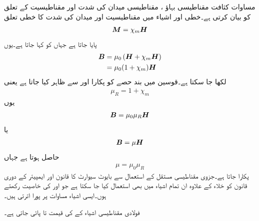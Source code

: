 مساوات  کثافت مقناطیسی  بہاؤ ، مقناطیسی میدان کی شدت  اور مقناطیسیت  کے تعلق کو بیان کرتی ہے۔خطی اور   اشیاء  میں مقناطیسیت اور میدان کی شدت کا خطی تعلق
\begin{align}\label{مساوات_امالہ_خطی_ہم_سمتی_اشیاء_تعلق}
{\ensuremath{{\boldsymbol{M}}}}=\chi_m {{\boldsymbol{H}}}
\end{align}
پایا جاتا ہے  جہاں  کو  کہا جاتا ہے۔یوں
\begin{align*}
{\ensuremath{{\boldsymbol{B}}}}&=\mu_0\left({{\boldsymbol{H}}}+\chi_m {{\boldsymbol{H}}} \right)\\
&=\mu_0 (1+\chi_m){{\boldsymbol{H}}}
\end{align*}
لکھا جا سکتا ہے۔قوسین میں بند حصے کو  پکارا اور  سے ظاہر کیا جاتا ہے یعنی
\begin{align}
\mu_R=1+\chi_m
\end{align}
یوں
\begin{align*}
{\ensuremath{{\boldsymbol{B}}}}=\mu_0 \mu_R {{\boldsymbol{H}}}
\end{align*}
یا
\begin{align}
{\ensuremath{{\boldsymbol{B}}}}=\mu {\ensuremath{{\boldsymbol{H}}}}
\end{align}
حاصل ہوتا ہے جہاں 
\begin{align}
\mu=\mu_0 \mu_R
\end{align}
 پکارا جاتا ہے۔جزوی مقناطیسی مستقل  کے استعمال سے بایوٹ سیوارٹ کا قانون اور ایمپیئر کے دوری قانون کو خلاء کے علاوہ ان تمام اشیاء میں بھی استعمال کیا جا سکتا ہے جو  اور     کی خاصیت رکھتے ہوں۔ایسی اشیاء مساوات  پر پورا اترتی ہیں۔

فولادی مقناطیسی اشیاء کے  کی قیمت  تا  پائی جاتی ہے۔

